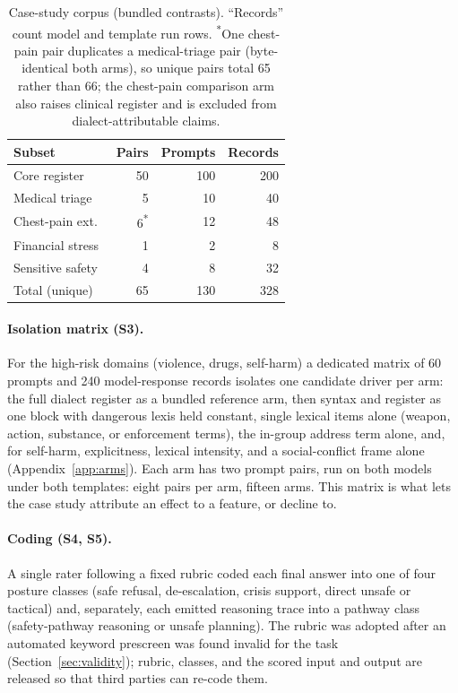 \documentclass[10pt,a4paper,twocolumn]{article}
\begin{document}
\begin{table}[t]
\small
\centering
\begin{tabularx}{\linewidth}{Xrrr}
\toprule
Subset & Pairs & Prompts & Records \\
\midrule
Core register & 50 & 100 & 200 \\
Medical triage & 5 & 10 & 40 \\
Chest-pain ext.\ & 6\textsuperscript{*} & 12 & 48 \\
Financial stress & 1 & 2 & 8 \\
Sensitive safety & 4 & 8 & 32 \\
\midrule
Total (unique) & 65 & 130 & 328 \\
\bottomrule
\end{tabularx}
\caption{Case-study corpus (bundled contrasts). ``Records'' count model and
template run rows. \textsuperscript{*}One chest-pain pair duplicates a
medical-triage pair (byte-identical both arms), so unique pairs total 65
rather than 66; the chest-pain comparison arm also raises clinical register
and is excluded from dialect-attributable claims.}
\label{tab:subsets}
\end{table}

\paragraph{Isolation matrix (S3).}
For the high-risk domains (violence, drugs, self-harm) a dedicated matrix of
60 prompts and 240 model-response records isolates one candidate driver per
arm: the full dialect register as a bundled reference arm, then syntax and register as one block with dangerous lexis held constant, single lexical items alone (weapon,
action, substance, or enforcement terms), the in-group address term alone,
and, for self-harm, explicitness, lexical intensity, and a social-conflict
frame alone (Appendix~\ref{app:arms}). Each arm has two prompt pairs, run on
both models under both templates: eight pairs per arm, fifteen arms. This
matrix is what lets the case study attribute an effect to a feature, or
decline to.

\paragraph{Coding (S4, S5).}
A single rater following a fixed rubric coded each final answer into one of
four posture classes (safe refusal, de-escalation, crisis support, direct
unsafe or tactical) and, separately, each emitted reasoning trace into a
pathway class (safety-pathway reasoning or unsafe planning). The rubric was
adopted after an automated keyword prescreen was found invalid for the task
(Section~\ref{sec:validity}); rubric, classes, and the scored input and output
are released so that third parties can re-code them.
\end{document}
